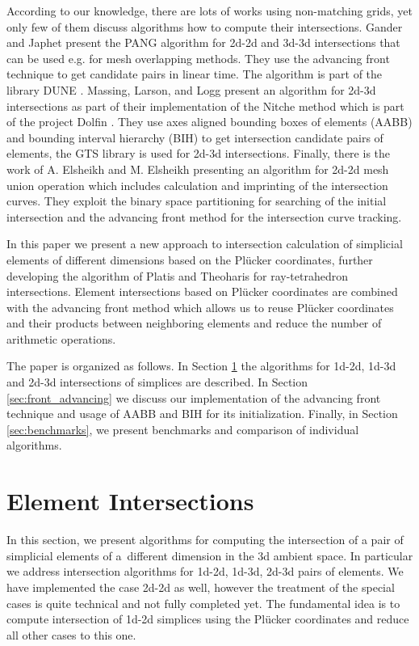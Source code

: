 \documentclass{elsarticle}
\newcommand{\plucker}{Pl\"{u}cker }
\begin{document}
According to our knowledge, there are lots of works using non-matching grids, yet only few of them discuss algorithms how to compute their intersections. 
Gander and Japhet \cite{gander_algorithm_2013} present the PANG algorithm for 2d-2d and 3d-3d intersections that can be used e.g. for mesh overlapping methods.
They use the advancing front technique to get candidate pairs in linear time. The algorithm is part of the library DUNE \cite{bastian_towards_2005}.
Massing, Larson, and Logg \cite{massing_efficient_2013} present an algorithm for 2d-3d intersections as part of their implementation of the Nitche method 
which is part of the project Dolfin \cite{Dolphin}. They use axes aligned bounding boxes of elements (AABB) and bounding interval hierarchy (BIH) 
to get intersection candidate pairs of elements, the GTS library \cite{gtslib} is used for 2d-3d intersections. 
Finally, there is the work of A. Elsheikh and M. Elsheikh \cite{elsheikh_reliable_2012} presenting an algorithm for 2d-2d mesh union operation which includes 
calculation and imprinting of the intersection curves. They exploit the binary space partitioning for searching of the initial intersection and 
the advancing front method for the intersection curve tracking. 

In this paper we present a new approach to intersection calculation of simplicial elements of different dimensions based on the \plucker coordinates,
further developing the algorithm of Platis and Theoharis \cite{platis_fast_2003} for ray-tetrahedron intersections. Element intersections based on 
\plucker coordinates are combined with the advancing front method which allows us to reuse \plucker coordinates and their products between neighboring
elements and reduce the number of arithmetic operations. 

The paper is organized as follows. In Section \ref{sec:element intersecitons} the algorithms for
1d-2d, 1d-3d and 2d-3d intersections of simplices are described. In Section \ref{sec:front_advancing} we discuss our implementation of the advancing front 
technique and usage of AABB and BIH for its initialization. Finally, in Section \ref{sec:benchmarks}, we present benchmarks and comparison of individual algorithms.


\section{Element Intersections}
\label{sec:element intersecitons}
In this section, we present algorithms for computing the intersection of a pair of simplicial elements of a~different dimension in the 3d ambient space. 
In particular we address intersection algorithms for 1d-2d, 1d-3d, 2d-3d pairs of elements. We have implemented the case 2d-2d as well, however the treatment 
of the special cases is quite technical and not fully completed yet. The fundamental idea is to compute intersection of 1d-2d simplices using the 
\plucker coordinates and reduce all other cases to this one. 
\end{document}
